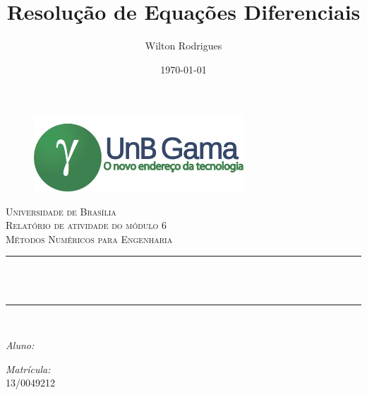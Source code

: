 \documentclass[12pt, hidelinks]{article}
\title{Resolução de Equações Diferenciais}         %
\author{Wilton Rodrigues}								%
\date{\today}											      %
\makeatletter
\let\thetitle\@title
\let\theauthor\@author
\let\thedate\@date
\makeatother
\begin{document}

\begin{titlepage}
  \centering
  \begin{figure}[H]
    \centering
    \includegraphics[width=0.7\textwidth]{figuras/logo.png}\\[2.0 cm]
  \end{figure}
  \textsc{\LARGE Universidade de Brasília}\\[2.5 cm]	%
  \textsc{\Large Relatório de atividade do módulo 6}\\[0.5 cm]				%
  \textsc{\large Métodos Numéricos para Engenharia}\\[1.5 cm]				%
  \rule{\linewidth}{0.2 mm} \\[0.4 cm]
  {\huge \bfseries \thetitle}\\
  \rule{\linewidth}{0.2 mm} \\[2.5 cm]

  \begin{minipage}{0.4\textwidth}
    \begin{flushleft} \large
      \emph{Aluno:}\\
      \theauthor
    \end{flushleft}
  \end{minipage}
  \begin{minipage}{0.4\textwidth}
    \begin{flushright} \large
      \emph{Matrícula:} \\
      13/0049212									%
    \end{flushright}
  \end{minipage}\\
  \vspace*{0.5in}
  {\large \thedate}\\[0.5 cm]

  \vfill

\end{titlepage}

\end{document}
